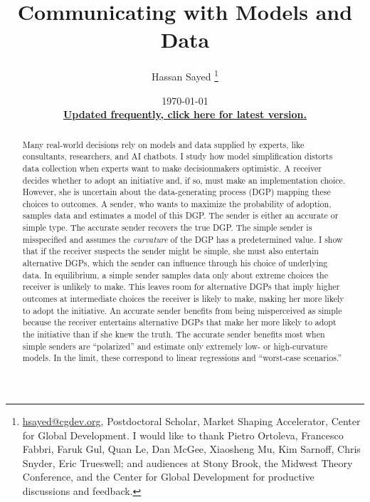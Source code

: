 \documentclass[11pt,dvipsnames]{article}
\title{Communicating with Models and Data}
\date{\today 
\\
\href{https://hassansayedecon.github.io/hassan-sayed.com/SimpleModels.pdf}{\textbf{Updated frequently, click here for latest version.}}}
\author{Hassan Sayed
\thanks{\href{mailto:hsayed@cgdev.org}{hsayed@cgdev.org}, Postdoctoral Scholar, Market Shaping Accelerator, Center for Global Development.
I would like to thank Pietro Ortoleva, Francesco Fabbri, Faruk Gul, Quan Le, Dan McGee, Xiaosheng Mu, Kim Sarnoff, Chris Snyder, Eric Trueswell; and audiences at Stony Brook, the Midwest Theory Conference, and the Center for Global Development for productive discussions and feedback.
}
}
\begin{document}
\begin{titlingpage}
\maketitle 
\begin{abstract}
\normalsize
Many real-world decisions rely on models and data supplied by experts, like consultants, researchers, and AI chatbots. I study how model simplification distorts data collection when experts want to make decisionmakers optimistic. A receiver decides whether to adopt an initiative and, if so, must make an implementation choice. However, she is uncertain about the data-generating process (DGP) mapping these choices to outcomes. A sender, who wants to maximize the probability of adoption, samples data and estimates a model of this DGP. The sender is either an accurate or simple type. The accurate sender recovers the true DGP. The simple sender is misspecified and assumes the \emph{curvature} of the DGP has a predetermined value. I show that if the receiver suspects the sender might be simple, she must also entertain alternative DGPs, which the sender can influence through his choice of underlying data. In equilibrium, a simple sender samples data only about extreme choices the receiver is unlikely to make. This leaves room for alternative DGPs that imply higher outcomes at intermediate choices the receiver is likely to make, making her more likely to adopt the initiative. An accurate sender benefits from being misperceived as simple because the receiver entertains alternative DGPs that make her more likely to adopt the initiative than if she knew the truth. The accurate sender benefits most when simple senders are ``polarized'' and estimate only extremely low- or high-curvature models. In the limit, these correspond to linear regressions and ``worst-case scenarios.''


\end{abstract}
\end{titlingpage}
\end{document}
